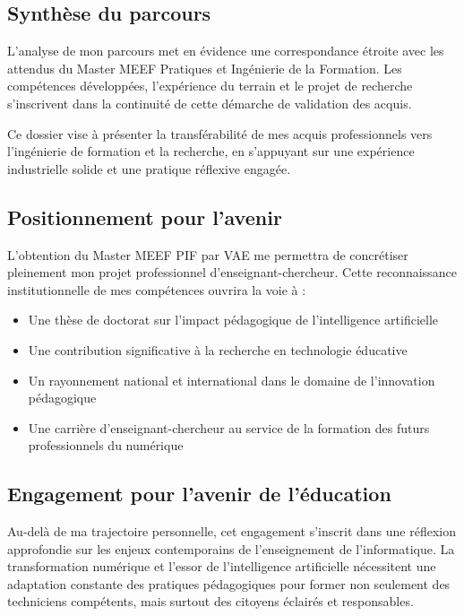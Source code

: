 \documentclass[12pt,a4paper]{report}
\begin{document}
\subsection*{Synthèse du parcours}

L'analyse de mon parcours met en évidence une correspondance étroite avec les attendus du Master MEEF Pratiques et Ingénierie de la Formation. Les compétences développées, l'expérience du terrain et le projet de recherche s'inscrivent dans la continuité de cette démarche de validation des acquis.

Ce dossier vise à présenter la transférabilité de mes acquis professionnels vers l'ingénierie de formation et la recherche, en s'appuyant sur une expérience industrielle solide et une pratique réflexive engagée.

\subsection*{Positionnement pour l'avenir}

L'obtention du Master MEEF PIF par VAE me permettra de concrétiser pleinement mon projet professionnel d'enseignant-chercheur. Cette reconnaissance institutionnelle de mes compétences ouvrira la voie à :

\begin{itemize}[leftmargin=*]
    \item Une thèse de doctorat sur l'impact pédagogique de l'intelligence artificielle
    \item Une contribution significative à la recherche en technologie éducative
    \item Un rayonnement national et international dans le domaine de l'innovation pédagogique
    \item Une carrière d'enseignant-chercheur au service de la formation des futurs professionnels du numérique
\end{itemize}

\subsection*{Engagement pour l'avenir de l'éducation}

Au-delà de ma trajectoire personnelle, cet engagement s'inscrit dans une réflexion approfondie sur les enjeux contemporains de l'enseignement de l'informatique. La transformation numérique et l'essor de l'intelligence artificielle nécessitent une adaptation constante des pratiques pédagogiques pour former non seulement des techniciens compétents, mais surtout des citoyens éclairés et responsables.
\end{document}
